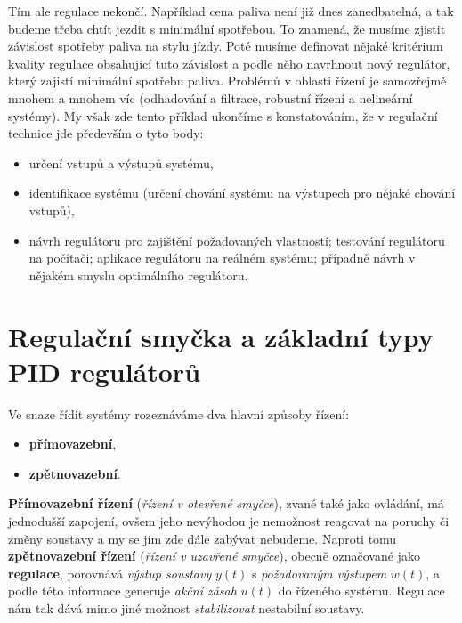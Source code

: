     Tím ale regulace nekončí. Například cena paliva není již dnes zanedbatelná, a tak budeme třeba 
    chtít jezdit s minimální spotřebou. To znamená, že musíme zjistit závislost spotřeby paliva na 
    stylu jízdy. Poté musíme definovat nějaké kritérium kvality regulace obsahující tuto závislost 
    a podle něho navrhnout nový regulátor, který zajistí minimální spotřebu paliva.  Problémů v 
    oblasti řízení je samozřejmě mnohem a mnohem víc  (odhadování a filtrace, robustní řízení a 
    nelineární systémy). My však zde tento příklad ukončíme s konstatováním, že v regulační 
    technice jde především o tyto body:
    \begin{itemize}[noitemsep]
      \item určení vstupů a výstupů systému,
      \item identifikace systému (určení chování systému na výstupech pro nějaké chování vstupů),
      \item návrh regulátoru pro zajištění požadovaných vlastností; testování regulátoru na 
            počítači; aplikace regulátoru na reálném systému; případně návrh v nějakém smyslu 
            optimálního regulátoru.
    \end{itemize}
    
  \section{Regulační smyčka a základní typy PID regulátorů}\label{TKY:sec001}
    Ve snaze řídit systémy rozeznáváme dva hlavní způsoby řízení:
      \begin{itemize}
        \item \textbf{přímovazební},
        \item \textbf{zpětnovazební}.
      \end{itemize}
    \textbf{Přímovazební řízení} (\emph{řízení v otevřené smyčce}), zvané také jako ovládání, má 
    jednodušší zapojení, ovšem jeho nevýhodou je nemožnost reagovat na poruchy či změny soustavy a 
    my se jím zde dále zabývat nebudeme. Naproti tomu \textbf{zpětnovazební řízení} (\emph{řízení v 
    uzavřené smyčce}), obecně označované jako \textbf{regulace}, porovnává \emph{výstup soustavy} 
    \(y(t)\) s \emph{požadovaným výstupem} \(w(t)\), a podle této informace generuje \emph{akční 
    zásah} \(u(t)\) do řízeného systému. Regulace nám tak dává mimo jiné možnost 
    \emph{stabilizovat} nestabilní soustavy.

